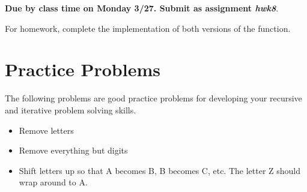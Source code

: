 \documentclass[nobib]{tufte-handout}
\begin{document}
\begin{center}
\textbf{Due by class time on Monday 3/27. Submit as assignment \textit{hwk8}}.
\end{center}

For homework, complete the implementation of both versions of the function.

\section{Practice Problems}

The following problems are good practice problems for developing your recursive and iterative problem solving skills.
\begin{itemize}
\item Remove letters
\item Remove everything but digits
\item Shift letters up so that A becomes B, B becomes C, etc.  The letter Z should wrap around to A.
\end{itemize}
\end{document}
